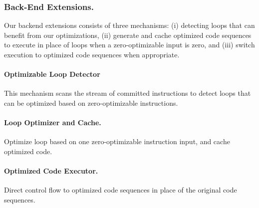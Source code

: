  
 
 \subsubsection{Back-End Extensions.}
 Our backend extensions consists of three mechanisms: (i) detecting loops that can benefit from our optimizations, (ii) generate and cache optimized code sequences to execute in place of loops when a zero-optimizable input is zero, and (iii) switch execution to optimized code  sequences when appropriate. 
 
\paragraph{Optimizable Loop Detector} This mechanism scans the stream of committed instructions to detect loops that can be optimized based on zero-optimizable instructions. 
 
\paragraph{Loop Optimizer and Cache.}  Optimize loop based on one zero-optimizable instruction input, and cache optimized code. 
 
 \paragraph{Optimized Code Executor.} Direct control flow to optimized code sequences in place of the original code sequences.   
 
 
